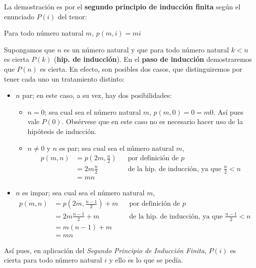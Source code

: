 \begin{solution}
  La demostración es por el \textbf{segundo principio de inducción
    finita} según el enunciado $P(i)$ del tenor:
  \begin{center}
    Para todo número natural $m$, $p(m,i)=mi$
  \end{center}
  Supongamos que $n$ es un número natural y que para todo número
  natural $k<n$ es cierta $P(k)$ (\textbf{hip. de inducción}). En el
  \textbf{paso de inducción} demostraremos que $P(n)$ es cierta. En
  efecto, son posibles dos casos, que distinguiremos por tener
  cada uno un tratamiento distinto:
  \begin{itemize}
  \item $n$ par; en este caso, a su vez, hay dos posibilidades:
    \begin{itemize}
    \item $n=0$; sea cual sea el número natural $m$,
      $p(m,0)=0=m0$. Así pues vale $P(0)$. Obsérvese que en este caso
      no es necesario hacer uso de la hipótesis de inducción.
    \item $n\neq 0$ y $n$ es par; sea cual sea el número natural $m$,
      \begin{align*}
        p(m,n)&=p\left(2m,\frac{n}{2}\right)&&\text{por definición de
                                               }p\\
              &=2m\frac{n}{2}&&\text{de la hip. de inducción, ya que
                                }\frac{n}{2}<n\\
              &=mn&&
      \end{align*}
    \end{itemize}
  \item $n$ es impar; sea cual sea el número natural $m$,
    \begin{align*}
      p(m,n)&=p\left(2m,\frac{n-1}{2}\right)+m&&\text{por definición de
                                             }p\\
            &=2m\frac{n-1}{2}+m&&\text{de la hip. de inducción, ya que
                              }\frac{n-1}{2}<n\\
            &=m(n-1)+m&&\\
            &=mn&&
    \end{align*}
  \end{itemize}
  Así pues, en aplicación del \textit{Segundo Principio de Inducción
    Finita}, $P(i)$ es cierta para todo número natural $i$ y ello es
  lo que se pedía.
\end{solution}


